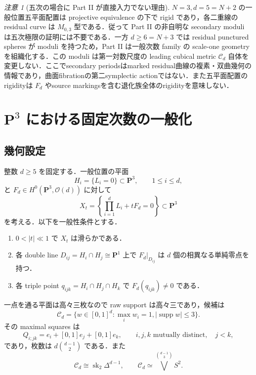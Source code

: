 \documentclass[a4paper,11pt]{ltjsarticle}
\numberwithin{equation}{section}
\theoremstyle{plain}
\theoremstyle{definition}
\theoremstyle{remark}
\newtheorem{remark}[theorem]{注意}
\newcommand{\PP}{\mathbf P}
\newcommand{\cC}{\mathcal C}
\newcommand{\supp}{\operatorname{supp}}
\newcommand{\sk}{\operatorname{sk}}
\begin{document}
\begin{remark}[五次の場合に Part II が直接入力でない理由]
\(N=3,d=5=N+2\) の一般位置五平面配置は projective equivalence の下で rigid であり，各二重線の residual curve は \(M_{0,3}\) 型である．従って Part II の非自明な secondary moduli は五次極限の証明には不要である．一方 \(d\ge6=N+3\) では residual punctured spheres が moduli を持つため，Part II は一般次数 family の scale-one geometry を組織化する．この moduli は第一対数尺度の leading cubical metric \(\cC_d\) 自体を変更しない．ここでsecondary periodsはmarked residual曲線の複素・双曲幾何の情報であり，曲面fibrationの第二symplectic actionではない．また五平面配置のrigidityは \(F_d\) やsource markingsを含む退化族全体のrigidityを意味しない．
\end{remark}

\section{\texorpdfstring{\(\PP^3\)}{P3} における固定次数の一般化}

\subsection{幾何設定}

整数 \(d\ge5\) を固定する．一般位置の平面
\[
 H_i=\{L_i=0\}\subset\PP^3,\qquad 1\le i\le d,
\]
と \(F_d\in H^0(\PP^3,\mathcal O(d))\) に対して
\begin{equation}
 X_t=\left\{\prod_{i=1}^dL_i+tF_d=0\right\}\subset\PP^3
\label{eq:degree-d-family}
\end{equation}
を考える．以下を一般性条件とする．

\begin{enumerate}[label=\textup{(G\(_d\)\arabic*)}]
\item \(0<|t|\ll1\) で \(X_t\) は滑らかである．
\item 各 double line \(D_{ij}=H_i\cap H_j\cong\PP^1\) 上で \(F_d|_{D_{ij}}\) は \(d\) 個の相異なる単純零点を持つ．
\item 各 triple point \(q_{ijk}=H_i\cap H_j\cap H_k\) で \(F_d(q_{ijk})\ne0\) である．
\end{enumerate}

一点を通る平面は高々三枚なので raw support は高々三であり，候補は
\begin{equation}
 \cC_d=\{w\in[0,1]^d:\max_iw_i=1, |\supp w|\le3\}.
\label{eq:Cd}
\end{equation}
その maximal squares は
\[
 Q_{i;jk}=e_i+[0,1]e_j+[0,1]e_k,\qquad
 i,j,k\text{ mutually distinct},\quad j<k,
\]
であり，枚数は \(d\binom{d-1}{2}\) である．また
\begin{equation}
 \cC_d\cong\sk_2\Delta^{d-1},\qquad
 \cC_d\simeq\bigvee^{\binom{d-1}{3}}S^2.
\label{eq:Cd-topology}
\end{equation}
\end{document}
